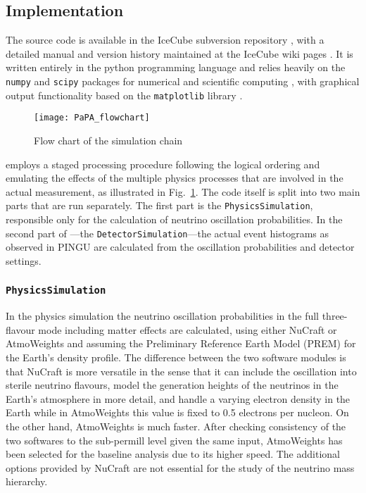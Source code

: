 \subsection{Implementation}
\label{sec:papa_code}

The \papa source code is available in the IceCube subversion repository 
\cite{papa_code}, with a detailed manual and version history maintained at the 
IceCube wiki pages \cite{papa_wiki}. It is written entirely in the python 
programming language \cite{python} and relies heavily on the \texttt{numpy} and 
\texttt{scipy} packages for numerical and scientific computing \cite{numpy, 
scipy}, with graphical output functionality based on the \texttt{matplotlib} 
library \cite{matplotlib}.

\begin{figure}
\centering
 \texttt{[image: PaPA\_flowchart]}
 \caption{Flow chart of the \papa simulation chain}
\label{fig:papa_flowchart}
\end{figure}

\papa employs a staged processing procedure following the logical ordering and 
emulating the effects of the multiple physics processes that are involved in 
the actual measurement, as illustrated in Fig.~\ref{fig:papa_flowchart}. The 
code itself is split into two main parts that are run separately. The first 
part is the \texttt{PhysicsSimulation}, responsible only for the calculation of 
neutrino oscillation probabilities. In the second part of \papa---the 
\texttt{DetectorSimulation}---the actual event histograms as observed in PINGU 
are calculated from the oscillation probabilities and detector settings.


\subsubsection{\texttt{PhysicsSimulation}}

In the physics simulation the neutrino oscillation probabilities in
the full three-flavour mode including matter effects are calculated, using
either NuCraft \cite{NuCraft} or AtmoWeights \cite{AtmoWeights} and assuming
the Preliminary Reference Earth Model (PREM) \cite{PREM} for the Earth's density
profile. The difference between the two software modules is that NuCraft is more
versatile in the sense that it
can include the oscillation into sterile neutrino flavours, model the
generation heights of the neutrinos in the Earth's atmosphere in more detail,
and handle a varying electron density in the Earth while in AtmoWeights this
value is fixed to 0.5 electrons per nucleon. On the other hand, AtmoWeights is
much faster. After checking consistency of the two softwares to the sub-permill
level given the same input, AtmoWeights has been selected for the baseline
analysis due to its higher speed. The additional options provided by NuCraft are
not essential for the study of the neutrino mass hierarchy.

